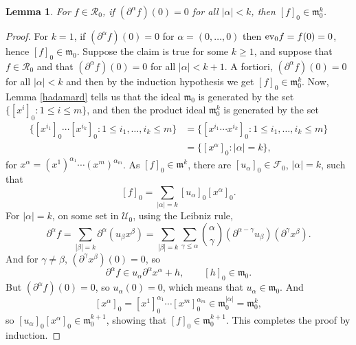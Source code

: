 \documentclass{article}
\newcommand{\ev}{\ensuremath\mathrm{ev}}
\newtheorem{lemma}[theorem]{Lemma}
\theoremstyle{definition}
\begin{document}
\begin{lemma}
For $f \in \mathcal{R}_0$, if $(\partial^\alpha f)(0) = 0$ for all $|\alpha|<k$, then $[f]_0 \in \mathfrak{m}_0^k$. 
\end{lemma}
\begin{proof}
For $k=1$, if $(\partial^\alpha f)(0)=0$ for $\alpha=(0,\ldots,0)$ then $\ev_0 f = f(0)=0$, hence
$[f]_0 \in \mathfrak{m}_0$. 
Suppose the claim is true for some
$k \geq 1$, and suppose that $f \in \mathcal{R}_0$ and that $(\partial^\alpha f)(0)=0$ for all $|\alpha|<k+1$.
A fortiori, $(\partial^\alpha f)(0)=0$ for all $|\alpha|<k$ and then by the induction hypothesis we get
$[f]_0 \in \mathfrak{m}_0^k$. Now, 
Lemma \ref{hadamard} tells us that the ideal $\mathfrak{m}_0$ is generated by the set
$\{[x^i]_0: 1 \leq i \leq m\}$, and then
the product ideal $\mathfrak{m}_0^k$ is generated by the
set 
\begin{align*}
\{[x^{i_1}]_0 \cdots [x^{i_k}]_0 : 1 \leq i_1,\ldots,i_k \leq m\}&=\{[x^{i_1} \cdots x^{i_k}]_0: 1 \leq i_1, \ldots, i_k \leq m\}\\
&=\{[x^\alpha]_0: |\alpha|=k\},
\end{align*}
for $x^\alpha = (x^1)^{\alpha_1} \cdots (x^m)^{\alpha_m}$. 
As $[f]_0 \in \mathfrak{m}^k$, there are $[u_\alpha]_0 \in \mathcal{F}_0$, $|\alpha|=k$, such that
\[
[f]_0 = \sum_{|\alpha|=k} [u_\alpha]_0 [x^\alpha]_0.
\]
For $|\alpha|=k$, on some set in $\mathcal{U}_0$, using the Leibniz rule,
\[
\partial^\alpha f = \sum_{|\beta|=k} \partial^\alpha (u_\beta x^\beta)
=\sum_{|\beta|=k} \sum_{\gamma \leq \alpha} \binom{\alpha}{\gamma} (\partial^{\alpha-\gamma} u_\beta) (\partial^{\gamma} x^\beta).
\]
And for $\gamma \neq \beta$, $(\partial^\gamma x^\beta)(0) = 0$, so 
\[
\partial^\alpha f \in u_\alpha \partial^\alpha x^\alpha + h,\qquad [h]_0 \in \mathfrak{m}_0.
\]
But $(\partial^\alpha f)(0)=0$, so $u_\alpha(0)=0$, which means that $u_\alpha \in \mathfrak{m}_0$. And
\[
[x^\alpha]_0 = [x^1]_0^{\alpha_1} \cdots [x^m]_0^{\alpha_m} \in \mathfrak{m}_0^{|\alpha|} = \mathfrak{m}_0^k,
\]
so $[u_\alpha]_0 [x^\alpha]_0 \in \mathfrak{m}_0^{k+1}$, showing that $[f]_0 \in \mathfrak{m}_0^{k+1}$. This completes the proof
by induction.
\end{proof}
\end{document}

